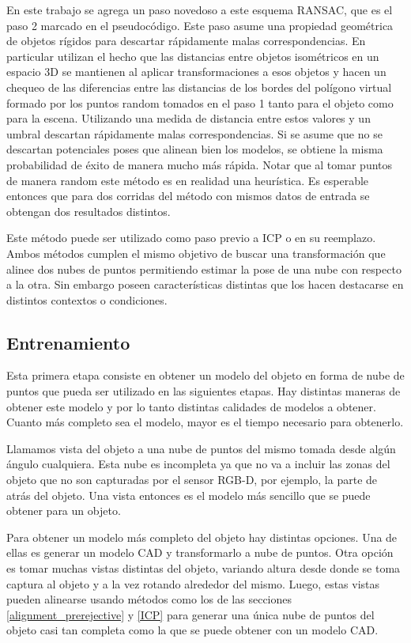 En este trabajo se agrega un paso novedoso a este esquema RANSAC, que es el paso 2 marcado en el pseudocódigo. Este paso asume una propiedad geométrica de objetos rígidos para descartar rápidamente malas correspondencias. En particular utilizan el hecho que las distancias entre objetos isométricos en un espacio 3D se mantienen al aplicar transformaciones a esos objetos y hacen un chequeo de las diferencias entre las distancias de los bordes del polígono virtual formado por los puntos random tomados en el paso 1 tanto para el objeto como para la escena. Utilizando una medida de distancia entre estos valores y un umbral descartan rápidamente malas correspondencias. Si se asume que no se descartan potenciales poses que alinean bien los modelos, se obtiene la misma probabilidad de éxito de manera mucho más rápida. Notar que al tomar puntos de manera random este método es en realidad una heurística. Es esperable entonces que para dos corridas del método con mismos datos de entrada se obtengan dos resultados distintos.

Este método puede ser utilizado como paso previo a ICP o en su reemplazo. Ambos métodos cumplen el mismo objetivo de buscar una transformación que alinee dos nubes de puntos permitiendo estimar la pose de una nube con respecto a la otra. Sin embargo poseen características distintas que los hacen destacarse en distintos contextos o condiciones.

\subsection{Entrenamiento}
Esta primera etapa consiste en obtener un modelo del objeto en forma de nube de puntos que pueda ser utilizado en las siguientes etapas. Hay distintas maneras de obtener este modelo y por lo tanto distintas calidades de modelos a obtener. Cuanto más completo sea el modelo, mayor es el tiempo necesario para obtenerlo.

Llamamos vista del objeto a una nube de puntos del mismo tomada desde algún ángulo cualquiera. Esta nube es incompleta ya que no va a incluir las zonas del objeto que no son capturadas por el sensor RGB-D, por ejemplo, la parte de atrás del objeto. Una vista entonces es el modelo más sencillo que se puede obtener para un objeto.

Para obtener un modelo más completo del objeto hay distintas opciones. Una de ellas es generar un modelo CAD y transformarlo a nube de puntos. Otra opción es tomar muchas vistas distintas del objeto, variando altura desde donde se toma captura al objeto y a la vez rotando alrededor del mismo. Luego, estas vistas pueden alinearse usando métodos como los de las secciones \ref{alignment_prerejective} y \ref{ICP} para generar una única nube de puntos del objeto casi tan completa como la que se puede obtener con un modelo CAD.

